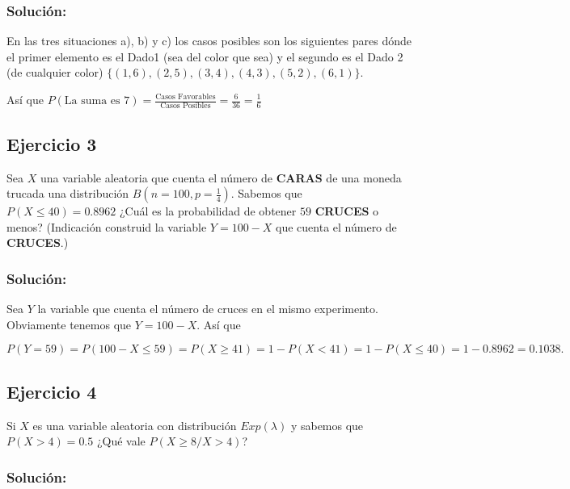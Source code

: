 \documentclass[
]{article}
\begin{document}
\hypertarget{soluciuxf3n-1}{%
\subsubsection{Solución:}\label{soluciuxf3n-1}}

En las tres situaciones a), b) y c) los casos posibles son los
siguientes pares dónde el primer elemento es el Dado1 (sea del color que
sea) y el segundo es el Dado 2 (de cualquier color)
\(\{(1,6),(2,5),(3,4),(4,3),(5,2),(6,1)\}\).

Así que
\(P( \mbox{La suma es } 7)=\frac{\mbox{Casos Favorables}}{\mbox{Casos Posibles}}=\frac{6}{36}=\frac{1}{6}\)

\hypertarget{ejercicio-3}{%
\subsection{Ejercicio 3}\label{ejercicio-3}}

Sea \(X\) una variable aleatoria que cuenta el número de \textbf{CARAS}
de una moneda trucada una distribución \(B(n=100,p=\frac{1}{4})\).
Sabemos que \(P(X\leq 40)=0.8962\) ¿Cuál es la probabilidad de obtener
\(59\) \textbf{CRUCES} o menos? (Indicación construid la variable
\(Y=100-X\) que cuenta el número de \textbf{CRUCES}.)

\hypertarget{soluciuxf3n-2}{%
\subsubsection{Solución:}\label{soluciuxf3n-2}}

Sea \(Y\) la variable que cuenta el número de cruces en el mismo
experimento. Obviamente tenemos que \(Y=100-X\). Así que

\[P(Y=59)= P(100-X\leq 59) = P(X\geq 41)= 1-P(X < 41)=1-P(X\leq 40)=1-0.8962=0.1038.\]

\hypertarget{ejercicio-4}{%
\subsection{Ejercicio 4}\label{ejercicio-4}}

Si \(X\) es una variable aleatoria con distribución \(Exp(\lambda)\) y
sabemos que \(P(X>4)=0.5\) ¿Qué vale \(P(X\geq 8/X>4)\)?

\hypertarget{soluciuxf3n-3}{%
\subsubsection{Solución:}\label{soluciuxf3n-3}}
\end{document}
